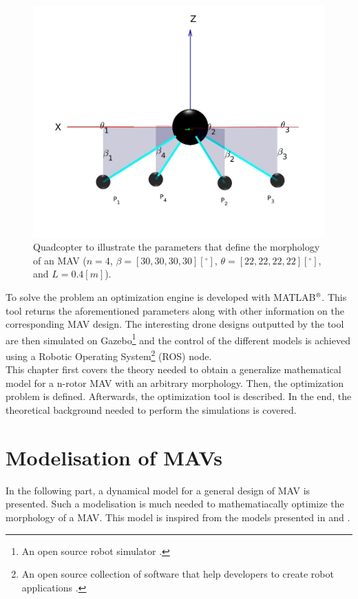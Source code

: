 \begin{figure}[h]
\begin{minipage}[t]{0.3\textwidth}
  \centering
  \includegraphics[width=\textwidth]{images/drone_design2.jpg}
\end{minipage}
\caption{Quadcopter to illustrate the parameters that define the morphology of an
MAV ($n = 4$, $\beta = [30, 30, 30, 30] [^{\circ}]$, $\theta = [22, 22, 22, 22]
[^{\circ}]$, and $L = 0.4 [m]$).}
\label{fig:drone_design}
\end{figure}

To solve the problem an optimization engine is developed with
MATLAB$^\textrm{\textregistered}$. This tool returns the aforementioned
parameters along with other information on the corresponding MAV design.
The interesting drone designs outputted by the tool are then simulated on
Gazebo\footnote{An open source robot simulator \citep{noauthor_gazebo_nodate}.}
and the control of the different models is achieved using a Robotic Operating
System\footnote{An open source collection of software that help developers to
create robot applications \citep{rostutorials}.} (ROS) node.\\
This chapter first covers the theory needed to obtain a generalize mathematical
model for a n-rotor MAV with an arbitrary morphology. Then, the optimization
problem is defined. Afterwards, the optimization tool is described. In the end,
the theoretical background needed to perform the simulations is covered.

\section{Modelisation of MAVs}
\label{sec:modeling_mav}
In the following part, a dynamical model for a general design of MAV is presented.
Such a modelisation is much needed to mathematiacally optimize the morphology of
a MAV. This model is inspired from the models presented in
\citep{kamel_voliro:_2018} and \citep{ryll_modeling_2012}.

